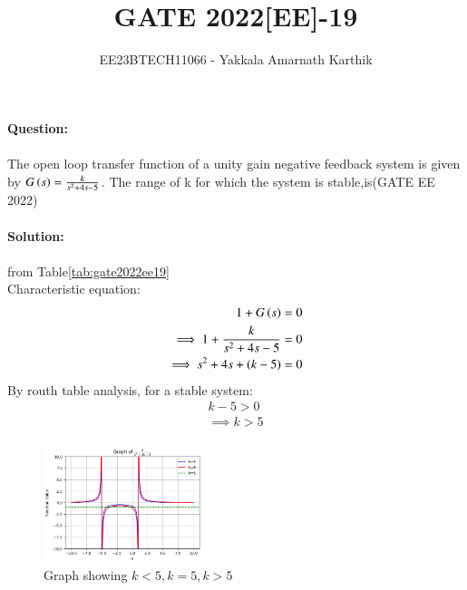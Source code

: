 \documentclass[journal,12pt,twocolumn]{IEEEtran}
\begin{document}


\title{GATE 2022[EE]-19}
\author{EE23BTECH11066 - Yakkala Amarnath Karthik}
\maketitle


\textbf{Question:}\\ \\
The open loop transfer function of a unity gain negative feedback system is given by $G\left(s\right)= \frac{k}{s^2 +4s-5}$. The range of k for which the system is stable,is\hfill(GATE EE 2022)\\ \\

\textbf{Solution:}\\ 
\\
 from Table\ref{tab:gate2022ee19}\\
Characteristic equation:
\begin{align}
    1+G\left(s\right)=0\\
    \implies 1+\frac{k}{s^2 +4s-5}=0\\
    \implies s^2+4s+\left(k-5\right)=0
\end{align}
By routh table analysis, for a stable system:
\begin{align}
    k-5>0\\
    \implies k>5
\end{align}


\begin{figure}[ht]
    \centering
    \includegraphics[width=0.45\textwidth]{figs/gate2022.png}
    \caption{Graph showing $k<5,k=5,k>5$}
\end{figure}
\end{document}
